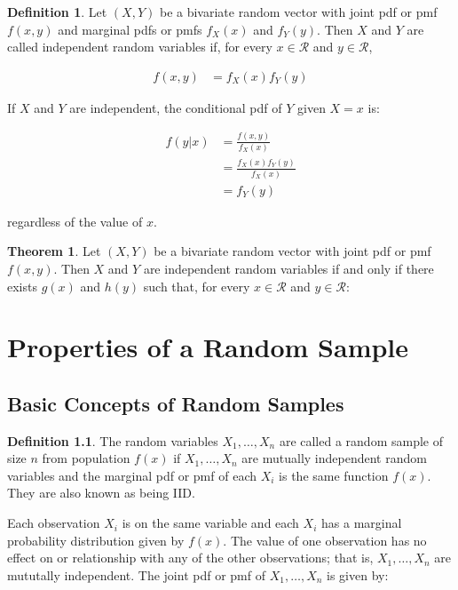 \documentclass[11pt,a4paper]{report}
\theoremstyle{definition} \newtheorem{defn}{Definition}[section]
\theoremstyle{theorem} \newtheorem{thm}{Theorem}[section]
\theoremstyle{example} \newtheorem{ex}{Example}[section]
\begin{document}
\begin{defn} Let $(X, Y)$ be a bivariate random vector with joint pdf
or pmf $f(x,y)$ and marginal pdfs or pmfs $f_X(x)$ and $f_Y(y)$.  Then
$X$ and $Y$ are called independent random variables if, for every $x
\in \mathcal{R}$ and $y \in \mathcal{R}$,

  \begin{align*} f(x,y) &= f_X(x) f_Y(y)
  \end{align*}

  If $X$ and $Y$ are independent, the conditional pdf of $Y$ given $X
= x$ is:

  \begin{align*} f(y|x) &= \frac{f(x,y)}{f_X(x)} \\ &= \frac{f_X(x)
f_Y(y)}{f_X(x)} \\ &= f_Y(y)
  \end{align*}

  regardless of the value of $x$.
\end{defn}

\begin{thm} Let $(X,Y)$ be a bivariate random vector with joint pdf or
pmf $f(x,y)$.  Then $X$ and $Y$ are independent random variables if
and only if there exists $g(x)$ and $h(y)$ such that, for every $x \in
\mathcal{R}$ and $y \in \mathcal{R}$:
\end{thm}

\chapter{Properties of a Random Sample}

\section{Basic Concepts of Random Samples}

\begin{defn} The random variables $X_1, \dots, X_n$ are called a
random sample of size $n$ from population $f(x)$ if $X_1, \dots, X_n$
are mutually independent random variables and the marginal pdf or pmf
of each $X_i$ is the same function $f(x)$.  They are also known as
being IID.
\end{defn}

Each observation $X_i$ is on the same variable and each $X_i$ has a
marginal probability distribution given by $f(x)$.  The value of one
observation has no effect on or relationship with any of the other
observations; that is, $X_1, \dots, X_n$ are mututally independent.
The joint pdf or pmf of $X_1, \dots, X_n$ is given by:
\end{document}
